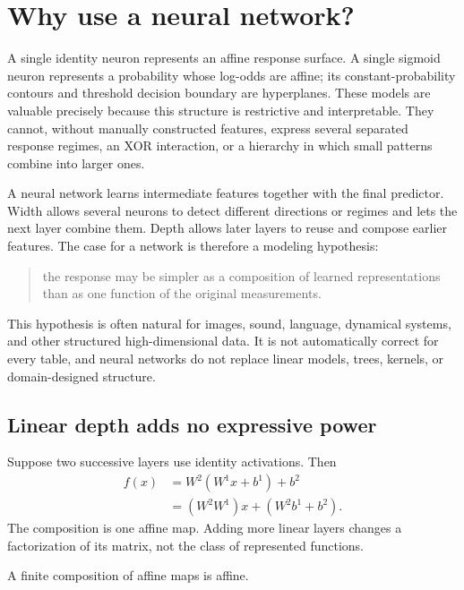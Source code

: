 
\section{Why use a neural network?}

A single identity neuron represents an affine response surface. A single
sigmoid neuron represents a probability whose log-odds are affine; its
constant-probability contours and threshold decision boundary are hyperplanes.
These models are valuable precisely because this structure is restrictive and
interpretable. They cannot, without manually constructed features, express
several separated response regimes, an XOR interaction, or a hierarchy in
which small patterns combine into larger ones.

A neural network learns intermediate features together with the final
predictor. Width allows several neurons to detect different directions or
regimes and lets the next layer combine them. Depth allows later layers to
reuse and compose earlier features. The case for a network is therefore a
modeling hypothesis:
\begin{quote}
the response may be simpler as a composition of learned representations than
as one function of the original measurements.
\end{quote}
This hypothesis is often natural for images, sound, language, dynamical
systems, and other structured high-dimensional data. It is not automatically
correct for every table, and neural networks do not replace linear models,
trees, kernels, or domain-designed structure.

\subsection{Linear depth adds no expressive power}

Suppose two successive layers use identity activations. Then
\[
\begin{aligned}
f(x)
&=W^2(W^1x+b^1)+b^2\\
&=(W^2W^1)x+(W^2b^1+b^2).
\end{aligned}
\]
The composition is one affine map. Adding more linear layers changes a
factorization of its matrix, not the class of represented functions.

\begin{proposition}
A finite composition of affine maps is affine.
\end{proposition}

